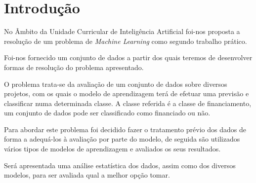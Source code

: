 \section*{Introdução}

No Âmbito da Unidade Curricular de Inteligência Artificial foi-nos proposta a resolução de um problema de \textit{Machine Learning} como segundo trabalho prático.

Foi-nos fornecido um conjunto de dados a partir dos quais teremos de desenvolver formas de resolução do problema apresentado.

O problema trata-se da avaliação de um conjunto de dados sobre diversos projetos, com os quais o modelo de aprendizagem terá de efetuar uma previsão e classificar numa determinada classe. A classe referida é a classe de financiamento, um conjunto de dados pode ser classificado como financiado ou não.

Para abordar este problema foi decidido fazer o tratamento prévio dos dados de forma a adequá-los à avaliação por parte do modelo, de seguida são utilizados vários tipos de modelos de aprendizagem e avaliados os seus resultados.

Será apresentada uma análise estatística dos dados, assim como dos diversos modelos, para ser avaliada qual a melhor opção tomar.
